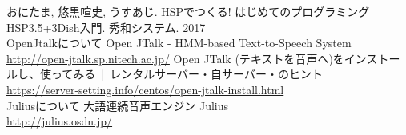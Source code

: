 \documentclass[a4paper]{ltjsbook}
\begin{document}
  
  
  
  
  
  
  
  
  
  
  
  
  
  
  
  
  \begin{thebibliography}{99}
   おにたま, 悠黒喧史, うすあじ. HSPでつくる! はじめてのプログラミング HSP3.5+3Dish入門. 秀和システム. 2017
  \\ OpenJtalkについて
   Open JTalk - HMM-based Text-to-Speech System \\ \url{http://open-jtalk.sp.nitech.ac.jp/}
   Open JTalk (テキストを音声へ)をインストールし、使ってみる | レンタルサーバー・自サーバー・のヒント \\ \url{https://server-setting.info/centos/open-jtalk-install.html}
  \\ Juliusについて
 大語連続音声エンジン Julius \\ \url{http://julius.osdn.jp/}
  \end{thebibliography}
\end{document}
